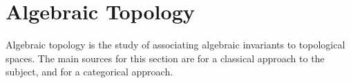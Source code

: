 \chapter{Algebraic Topology}\label{cha:algebraic-topology}
Algebraic topology is the study of associating algebraic invariants to topological spaces. The main sources for this section are \cite{Hatcher:Algebraic:Topology} for a classical approach to the subject, and \cite{May:A_Concise_Course_In_Algebraic_Topology} for a categorical approach.

